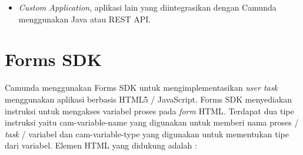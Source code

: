 \begin{itemize}
	\item \textit{Custom Application}, aplikasi lain yang diintegrasikan dengan Camunda menggunakan Java atau REST API.
	
\end{itemize}

\section{Forms SDK}
\label{formssdk}
Camunda menggunakan Forms SDK untuk mengimplementasikan \textit{user task} menggunakan aplikasi berbasis HTML5 / JavaScript. Forms SDK menyediakan instruksi untuk mengakses variabel proses pada \textit{form} HTML. Terdapat dua tipe instruksi yaitu cam-variable-name yang digunakan untuk memberi nama proses / \textit{task} / variabel dan cam-variable-type yang digunakan untuk mementukan tipe dari variabel. Elemen HTML yang didukung adalah :
